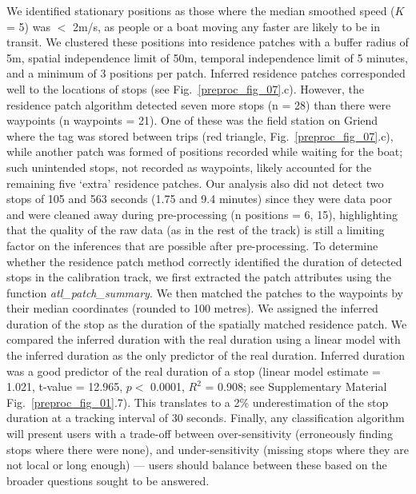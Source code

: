We identified stationary positions as those where the median smoothed speed ($K$ = 5) was $<$ 2m/s, as people or a boat moving any faster are likely to be in transit.
We clustered these positions into residence patches with a buffer radius of 5m, spatial independence limit of 50m, temporal independence limit of 5 minutes, and a minimum of 3 positions per patch.
Inferred residence patches corresponded well to the locations of stops (see Fig.~\ref{preproc_fig_07}.c).
However, the residence patch algorithm detected seven more stops (n = 28) than there were waypoints (n waypoints = 21).
One of these was the field station on Griend where the tag was stored between trips (red triangle, Fig.~\ref{preproc_fig_07}.c), while another patch was formed of positions recorded while waiting for the boat; such unintended stops, not recorded as waypoints, likely accounted for the remaining five `extra' residence patches.
Our analysis also did not detect two stops of 105 and 563 seconds (1.75 and 9.4 minutes) since they were data poor and were cleaned away during pre-processing (n positions = 6, 15), highlighting that the quality of the raw data (as in the rest of the track) is still a limiting factor on the inferences that are possible after pre-processing.
To determine whether the residence patch method correctly identified the duration of detected stops in the calibration track, we first extracted the patch attributes using the function \textit{atl\_patch\_summary}.
We then matched the patches to the waypoints by their median coordinates (rounded to 100 metres).
We assigned the inferred duration of the stop as the duration of the spatially matched residence patch.
We compared the inferred duration with the real duration using a linear model with the inferred duration as the only predictor of the real duration.
Inferred duration was a good predictor of the real duration of a stop (linear model estimate = 1.021, t-value = 12.965, $p <$ 0.0001, $R^2$ = 0.908; see Supplementary Material Fig.~\ref{preproc_fig_01}.7).
This translates to a 2\% underestimation of the stop duration at a tracking interval of 30 seconds.
Finally, any classification algorithm will present users with a trade-off between over-sensitivity (erroneously finding stops where there were none), and under-sensitivity (missing stops where they are not local or long enough) --- users should balance between these based on the broader questions sought to be answered.

